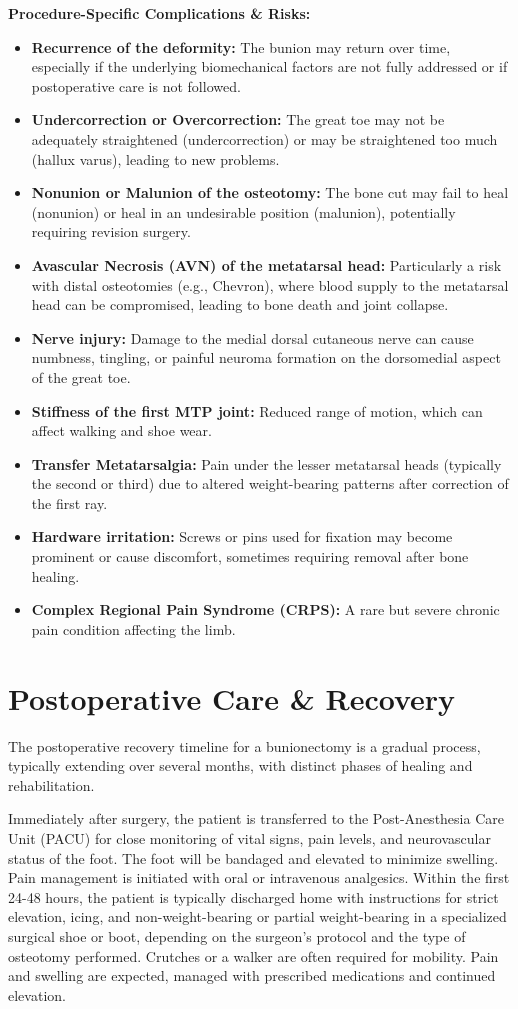 \textbf{Procedure-Specific Complications \& Risks:}
\begin{itemize}
  \item \textbf{Recurrence of the deformity:} The bunion may return over time, especially if the underlying biomechanical factors are not fully addressed or if postoperative care is not followed.
  \item \textbf{Undercorrection or Overcorrection:} The great toe may not be adequately straightened (undercorrection) or may be straightened too much (hallux varus), leading to new problems.
  \item \textbf{Nonunion or Malunion of the osteotomy:} The bone cut may fail to heal (nonunion) or heal in an undesirable position (malunion), potentially requiring revision surgery.
  \item \textbf{Avascular Necrosis (AVN) of the metatarsal head:} Particularly a risk with distal osteotomies (e.g., Chevron), where blood supply to the metatarsal head can be compromised, leading to bone death and joint collapse.
  \item \textbf{Nerve injury:} Damage to the medial dorsal cutaneous nerve can cause numbness, tingling, or painful neuroma formation on the dorsomedial aspect of the great toe.
  \item \textbf{Stiffness of the first MTP joint:} Reduced range of motion, which can affect walking and shoe wear.
  \item \textbf{Transfer Metatarsalgia:} Pain under the lesser metatarsal heads (typically the second or third) due to altered weight-bearing patterns after correction of the first ray.
  \item \textbf{Hardware irritation:} Screws or pins used for fixation may become prominent or cause discomfort, sometimes requiring removal after bone healing.
  \item \textbf{Complex Regional Pain Syndrome (CRPS):} A rare but severe chronic pain condition affecting the limb.
\end{itemize}

\section*{Postoperative Care \& Recovery}
The postoperative recovery timeline for a bunionectomy is a gradual process, typically extending over several months, with distinct phases of healing and rehabilitation.

Immediately after surgery, the patient is transferred to the Post-Anesthesia Care Unit (PACU) for close monitoring of vital signs, pain levels, and neurovascular status of the foot. The foot will be bandaged and elevated to minimize swelling. Pain management is initiated with oral or intravenous analgesics. Within the first 24-48 hours, the patient is typically discharged home with instructions for strict elevation, icing, and non-weight-bearing or partial weight-bearing in a specialized surgical shoe or boot, depending on the surgeon's protocol and the type of osteotomy performed. Crutches or a walker are often required for mobility. Pain and swelling are expected, managed with prescribed medications and continued elevation.

